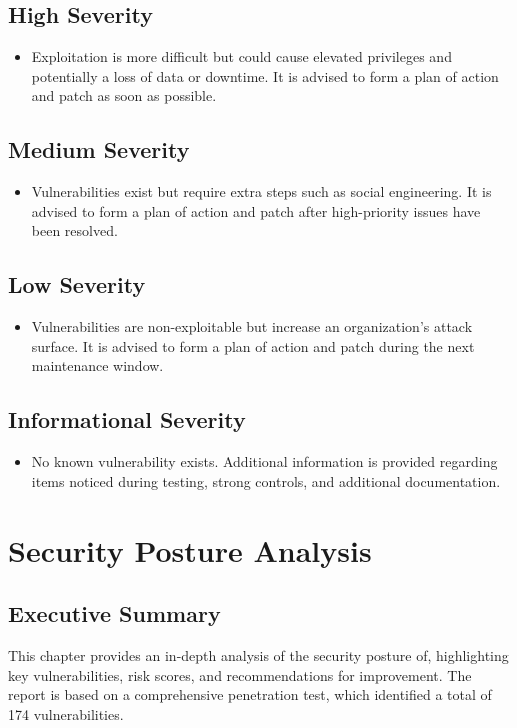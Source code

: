 \section{High Severity}
\begin{itemize}
\item Exploitation is more difficult but could cause elevated privileges and potentially a loss of data or downtime. It is advised to form a plan of action and patch as soon as possible.
\end{itemize}
\section{Medium Severity}
\begin{itemize}
\item Vulnerabilities exist but require extra steps such as social engineering. It is advised to form a plan of action and patch after high-priority issues have been resolved.
\end{itemize}
\section{Low Severity}
\begin{itemize}
\item Vulnerabilities are non-exploitable but increase an organization's attack surface. It is advised to form a plan of action and patch during the next maintenance window.
\end{itemize}
\section{Informational Severity}
\begin{itemize}
\item No known vulnerability exists. Additional information is provided regarding items noticed during testing, strong controls, and additional documentation.
\end{itemize}

\chapter{Security Posture Analysis}

\section{Executive Summary}

This chapter provides an in-depth analysis of the security posture of, highlighting key vulnerabilities, risk scores, and recommendations for improvement. The report is based on a comprehensive penetration test, which identified a total of 174 vulnerabilities.

